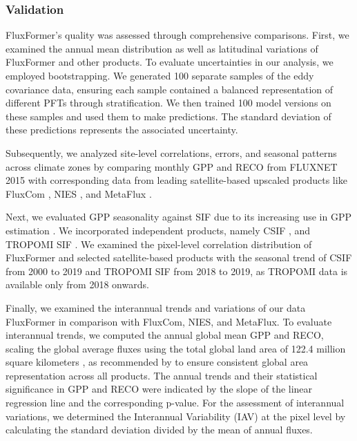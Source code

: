 \subsubsection{Validation}
FluxFormer's quality was assessed through comprehensive comparisons. First, we examined the annual mean distribution as well as latitudinal variations of FluxFormer and other products. To evaluate uncertainties in our analysis, we employed bootstrapping. We generated 100 separate samples of the eddy covariance data, ensuring each sample contained a balanced representation of different PFTs through stratification. We then trained 100 model versions on these samples and used them to make predictions. The standard deviation of these predictions represents the associated uncertainty. \par

Subsequently, we analyzed site-level correlations, errors, and seasonal patterns across climate zones by comparing monthly GPP and RECO from FLUXNET 2015 with corresponding data from leading satellite-based upscaled products like FluxCom \citep{jung2019fluxcom}, NIES \citep{zeng2020global}, and MetaFlux \citep{nathaniel2023metaflux}. \par

Next, we evaluated GPP seasonality against SIF due to its increasing use in GPP estimation \citep{norton2019estimating, liu2020improving, bai2022estimation}. We incorporated independent products, namely CSIF \citep{zhang2018global}, and TROPOMI SIF \citep{kohler2018global}. We examined the pixel-level correlation distribution of FluxFormer and selected satellite-based products with the seasonal trend of CSIF from 2000 to 2019 and TROPOMI SIF from 2018 to 2019, as TROPOMI data is available only from 2018 onwards. \par

Finally, we examined the interannual trends and variations of our data FluxFormer in comparison with FluxCom, NIES, and MetaFlux. To evaluate interannual trends, we computed the annual global mean GPP and RECO, scaling the global average fluxes using the total global land area of 122.4 million square kilometers \citep{friedl2010modis}, as recommended by \citep{jung2020scaling} to ensure consistent global area representation across all products. The annual trends and their statistical significance in GPP and RECO were indicated by the slope of the linear regression line and the corresponding p-value. For the assessment of interannual variations, we determined the Interannual Variability (IAV) at the pixel level by calculating the standard deviation divided by the mean of annual fluxes.\par

